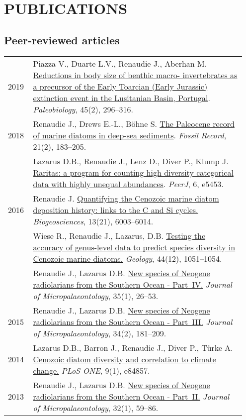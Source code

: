\documentclass[11pt, a4paper]{article}
\begin{document}
\section{PUBLICATIONS}
\subsection{Peer-reviewed articles}
\begin{longtable}{p{0.1\linewidth} P{0.85\linewidth}}
2019 & Piazza V., Duarte L.V., Renaudie J., Aberhan M. \href{http://doi.org/10.1017/pab.2019.11}{Reductions in body size of benthic macro- invertebrates as a precursor of the Early Toarcian (Early Jurassic) extinction event in the Lusitanian Basin, Portugal}. \textit{Paleobiology}, 45(2), 296--316.\\
2018 & Renaudie J., Drews E.-L., B\"{o}hne S. \href{http://dx.doi.org/10.5194/fr-21-183-2018}{The Paleocene record of marine diatoms in deep-sea sediments}. \textit{Fossil Record}, 21(2), 183--205.\\
& Lazarus D.B., Renaudie J., Lenz D., Diver P., Klump J. \href{http://dx.doi.org/10.7717/peerj.5453}{Raritas: a program for counting high diversity categorical data with highly unequal abundances}. \textit{PeerJ}, 6, e5453.\\
2016 & Renaudie J. \href{http://dx.doi.org/10.5194/bg-13-6003-2016}{Quantifying the Cenozoic marine diatom deposition history: links to the C and Si cycles.} \textit{Biogeosciences}, 13(21), 6003--6014.\\
 & Wiese R., Renaudie J., Lazarus, D.B. \href{http://dx.doi.org/10.1130/G38347.1}{Testing the accuracy of genus-level data to predict species diversity in Cenozoic marine diatoms.} \textit{Geology}, 44(12), 1051--1054.\\
 & Renaudie J., Lazarus D.B. \href{http://dx.doi.org/10.1144/jmpaleo2014-026}{New species of Neogene radiolarians from the Southern Ocean - Part IV.} \textit{Journal of Micropalaeontology}, 35(1), 26--53.\\
2015 & Renaudie J., Lazarus D.B. \href{http://dx.doi.org/10.1144/jmpaleo2013-034}{New species of Neogene radiolarians from the Southern Ocean - Part III.} \textit{Journal of Micropalaeontology}, 34(2), 181--209.\\
2014 & Lazarus D.B., Barron J., Renaudie J., Diver P., Türke A. \href{http://dx.doi.org/10.1371/journal.pone.0084857}{Cenozoic diatom diversity and correlation to climate change.} \textit{PLoS ONE}, 9(1), e84857.\\
2013 & Renaudie J., Lazarus D.B. \href{http://dx.doi.org/10.1144/jmpaleo2011-025}{New species of Neogene radiolarians from the Southern Ocean - Part II.} \textit{Journal of Micropalaeontology}, 32(1), 59--86.\\

\end{longtable}
\end{document}
